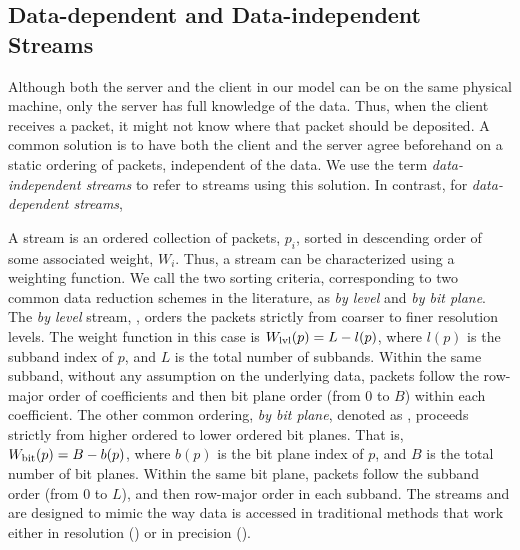 \subsection{Data-dependent and Data-independent Streams} \label{sec:static-dynamic-streams}

Although both the server and the client in our model can be on the same physical
machine, only the server has full knowledge of the data. Thus, when the client
receives a packet, it might not know where that packet should be deposited. A
common solution is to have both the client and the server agree beforehand on a
static ordering of packets, independent of the data. We use the term
\emph{data-independent streams} to refer to streams using this solution. In
contrast, for \emph{data-dependent streams},  

A stream is an ordered collection of packets, $p_i$, sorted in descending order
of some associated weight, $W_i$. Thus, a stream can be characterized using a
weighting function.
%
We call the two sorting criteria, corresponding to two common data reduction
schemes in the literature, as \emph{by level} and \emph{by bit plane}.  The
\emph{by level} stream, \slvl, orders the packets strictly from coarser to
finer resolution levels. The weight function in this case is $\wlvl(p)=L-l(p)$,
where $l(p)$ is the subband index of $p$, and $L$ is the total number of
subbands. Within the same subband, without any assumption on the underlying
data, packets follow the row-major order of coefficients and then bit plane order
(from 0 to $B$) within each coefficient. The other common ordering, \emph{by
bit plane}, denoted as \sbit, proceeds strictly from higher ordered to
lower ordered bit planes. That is, $\wbit(p)=B-b(p)$, where $b(p)$ is the bit
plane index of $p$, and $B$ is the total number of bit planes. Within the same
bit plane, packets follow the subband order (from 0 to $L$), and then row-major
order in each subband. 
%
The streams \slvl and \sbit are designed to mimic the way data is accessed in
traditional methods that work either in resolution (\slvl) or in precision
(\sbit). 

